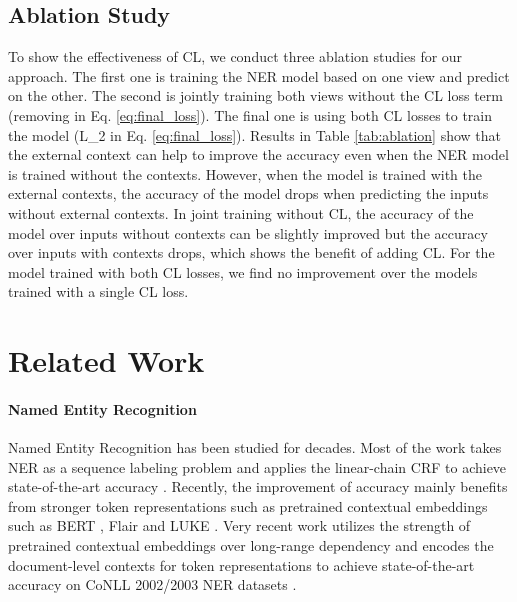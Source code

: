 \documentclass[11pt,a4paper]{article}
\begin{document}
\subsection{Ablation Study}
To show the effectiveness of CL, we conduct three ablation studies for our approach. The first one is training the NER model based on one view and predict on the other. The second is jointly training both views without the CL loss term (removing  in Eq. \ref{eq:final_loss}). The final one is using both CL losses to train the model (L_2 in Eq. \ref{eq:final_loss}). Results in Table \ref{tab:ablation} show that the external context can help to improve the accuracy even when the NER model is trained without the contexts. However, when the model is trained with the external contexts, the accuracy of the model drops when predicting the inputs without external contexts. In joint training without CL, the accuracy of the model over inputs without contexts can be slightly improved but the accuracy over inputs with contexts drops, which shows the benefit of adding CL. For the model trained with both CL losses, we find no improvement over the models trained with a single CL loss. 


\section{Related Work}
\paragraph{Named Entity Recognition}
Named Entity Recognition \citep{Sundheim1995NamedET} has been studied for decades. Most of the work takes NER as a sequence labeling problem and applies the linear-chain CRF \citep{10.5555/645530.655813} to achieve state-of-the-art accuracy \citep{ma-hovy-2016-end,lample-etal-2016-neural,akbik-etal-2018-contextual,akbik-etal-2019-pooled,wang-etal-2020-more}. 
Recently, the improvement of accuracy mainly benefits from stronger token representations such as pretrained contextual embeddings such as BERT \citep{devlin-etal-2019-bert}, Flair \citep{akbik-etal-2018-contextual} and LUKE \citep{yamada-etal-2020-luke}. Very recent work \citep{yu-etal-2020-named,yamada-etal-2020-luke} utilizes the strength of pretrained contextual embeddings over long-range dependency and encodes the document-level contexts for token representations to achieve state-of-the-art accuracy on CoNLL 2002/2003 NER datasets \citep{tjong-kim-sang-2002-introduction,tjong-kim-sang-de-meulder-2003-introduction}. 
\end{document}
